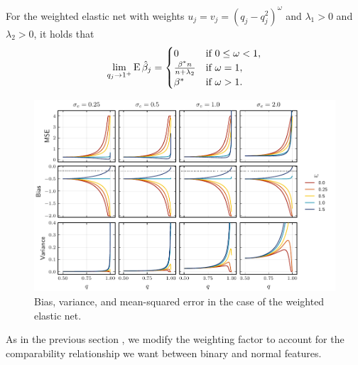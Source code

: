 \begin{theorem}
  \label{thm:weighted-elasticnet-bias}
  For the weighted elastic net with weights \(u_j = v_j = (q_j-q_j^2)^\omega\) and \(\lambda_1 > 0\) and \(\lambda_2 > 0\), it holds that
  \[
    \lim_{q_j \rightarrow 1^+} \operatorname{E} \hat{\beta}_j =
    \begin{cases}
      0                              & \text{if } 0 \leq \omega < 1, \\
      \frac{\beta^*n}{n + \lambda_2} & \text{if } \omega = 1,        \\
      \beta^*                        & \text{if } \omega > 1.
    \end{cases}
  \]
\end{theorem}

\begin{figure}[htpb]
  \centering
  \includegraphics[]{plots/binary_onedim_bias_var_elnet.pdf}
  \caption{%
    Bias, variance, and mean-squared error in the case of the weighted elastic net.
  }
  \label{fig:binary-onedim-bias-var-elnet}
\end{figure}

As in the previous section , we modify the weighting factor to account
for the comparability relationship we want between binary and normal features.
